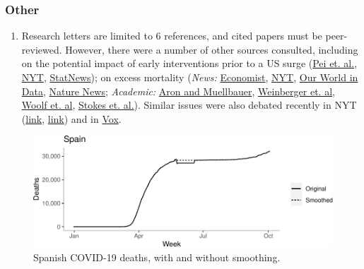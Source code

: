\documentclass[
]{article}
\providecommand{\tightlist}{%
  \setlength{\itemsep}{0pt}\setlength{\parskip}{0pt}}
\begin{document}
\bigskip

\hypertarget{other}{%
\subsubsection{Other}\label{other}}

\begin{enumerate}
\def\labelenumi{\arabic{enumi}.}
\tightlist
\item
  Research letters are limited to 6 references, and cited papers must be
  peer-reviewed. However, there were a number of other sources
  consulted, including on the potential impact of early interventions
  prior to a US surge
  (\href{https://www.medrxiv.org/content/10.1101/2020.05.15.20103655v2}{Pei et. al.},
  \href{https://www.nytimes.com/2020/04/14/opinion/covid-social-distancing.html?searchResultPosition=2}{NYT},
  \href{https://www.statnews.com/2020/06/19/faster-response-prevented-most-us-covid-19-deaths/}{StatNews});
  on excess mortality (\emph{News:}
  \href{https://www.economist.com/graphic-detail/2020/07/15/tracking-covid-19-excess-deaths-across-countries}{Economist},
  \href{https://www.nytimes.com/interactive/2020/04/21/world/coronavirus-missing-deaths.html}{NYT},
  \href{https://ourworldindata.org/excess-mortality-covid}{Our World in Data},
  \href{https://www.nature.com/articles/d41586-020-02497-w}{Nature News};
  \emph{Academic:}
  \href{https://www.inet.ox.ac.uk/files/15.44-final-25-Aug-20-Aron-Muellbauer-Transatlantic-excess-mortality-comparison-r.pdf}{Aron and Muellbauer},
  \href{https://jamanetwork.com/journals/jamainternalmedicine/fullarticle/2767980}{Weinberger et. al},
  \href{https://jamanetwork.com/journals/jama/fullarticle/2768086}{Woolf et. al},
  \href{https://www.medrxiv.org/content/10.1101/2020.08.31.20184036v3}{Stokes et. al.}).
  Similar issues were also debated recently in NYT
  (\href{https://www.nytimes.com/2020/09/01/briefing/coronavirus-kenosha-massachusetts-your-tuesday-briefing.html}{link},
  \href{https://www.nytimes.com/2020/09/05/opinion/sunday/covid-19-trump.html}{link})
  and in
  \href{https://www.vox.com/future-perfect/2020/9/9/21428769/covid-19-coronavirus-deaths-statistics-us-canada-europe}{Vox}.
\end{enumerate}

\bigskip

\clearpage

\begin{figure}
\centering
\includegraphics{extended_supplement_FINAL_files/figure-latex/spain-1.pdf}
\caption{\label{supp.fig.spain} Spanish COVID-19 deaths, with and
without smoothing.}
\end{figure}
\end{document}
